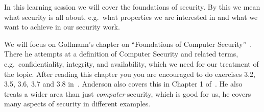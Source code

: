 In this learning session we will cover the foundations of security.
By this we mean what security is all about, e.g.\ what properties we are 
interested in and what we want to achieve in our security work.

We will focus on Gollmann's chapter on \enquote{Foundations of Computer 
Security}~\cite[Chap.\ 3]{Gollmann2011cs}.
There he attempts at a definition of Computer Security and related terms, 
e.g.~confidentiality, integrity, and availability, which we need for our 
treatment of the topic.
After reading this chapter you you are encouraged to do exercises 3.2, 3.5, 
3.6, 3.7 and 3.8 in~\cite{Gollmann2011cs}.
Anderson also covers this in Chapter 1 of~\cite{Anderson2008sea}.
He also treats a wider area than just \emph{computer} security, which is good 
for us, he covers many aspects of security in different examples.
